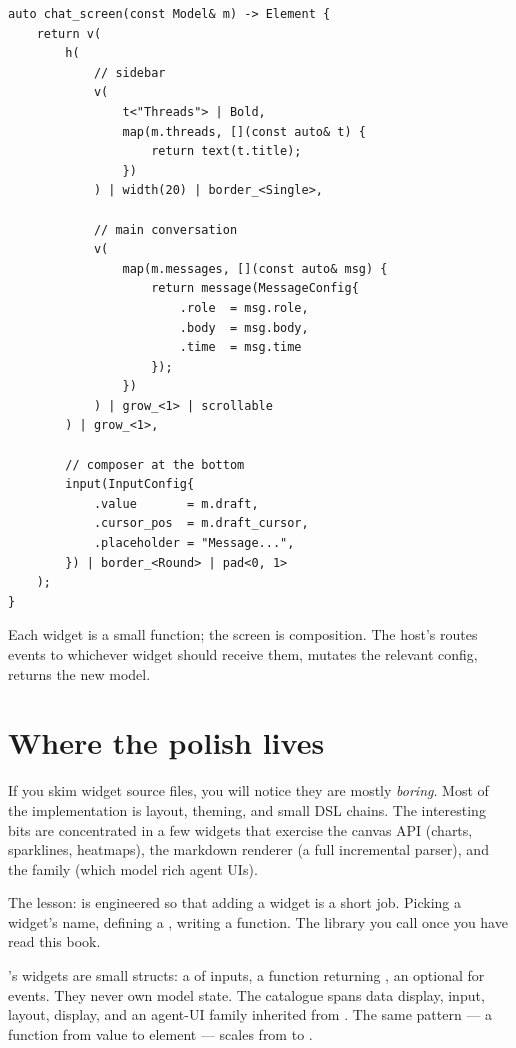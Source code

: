 \begin{lstlisting}
auto chat_screen(const Model& m) -> Element {
    return v(
        h(
            // sidebar
            v(
                t<"Threads"> | Bold,
                map(m.threads, [](const auto& t) {
                    return text(t.title);
                })
            ) | width(20) | border_<Single>,

            // main conversation
            v(
                map(m.messages, [](const auto& msg) {
                    return message(MessageConfig{
                        .role  = msg.role,
                        .body  = msg.body,
                        .time  = msg.time
                    });
                })
            ) | grow_<1> | scrollable
        ) | grow_<1>,

        // composer at the bottom
        input(InputConfig{
            .value       = m.draft,
            .cursor_pos  = m.draft_cursor,
            .placeholder = "Message...",
        }) | border_<Round> | pad<0, 1>
    );
}
\end{lstlisting}

Each widget is a small function; the screen is composition. The
host's  routes events to whichever widget should
receive them, mutates the relevant config, returns the new model.

\section{Where the polish lives}

If you skim widget source files, you will notice they are mostly
\emph{boring}. Most of the implementation is layout, theming, and
small DSL chains. The interesting bits are concentrated in a few
widgets that exercise the canvas API (charts, sparklines,
heatmaps), the markdown renderer (a full incremental parser), and
the  family (which model rich agent UIs).

The lesson: \maya{} is engineered so that adding a widget is a
short job. Picking a widget's name, defining a ,
writing a  function. The library you call once you have
read this book.

\begin{recap}
\maya{}'s widgets are small structs: a  of inputs, a
 function returning , an optional
 for events. They never own model state. The
catalogue spans data display, input, layout, display, and an
agent-UI family inherited from \agentty{}. The same pattern --- a
function from value to element --- scales from  to
.
\end{recap}

